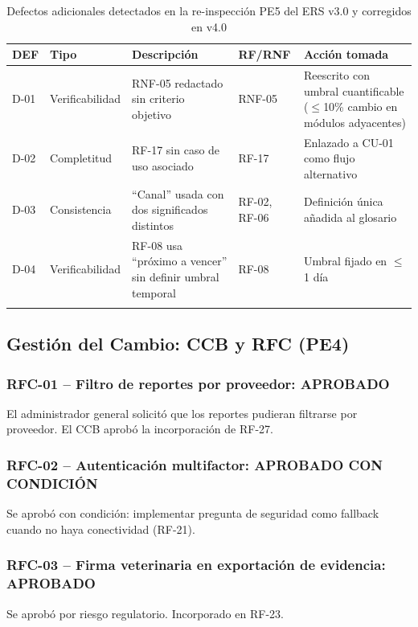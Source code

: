 \documentclass[11pt,a4paper]{article}
\begin{document}
\begin{longtable}{|p{1cm}|p{2.25cm}|p{5cm}|p{2cm}|p{3.5cm}|}
\hline
\textbf{DEF} & \textbf{Tipo} & \textbf{Descripción} & \textbf{RF/RNF} & \textbf{Acción tomada} \\
\hline
D-01 & Verificabilidad & RNF-05 redactado sin criterio objetivo & RNF-05 & Reescrito con umbral cuantificable ($\leq$10\% cambio en módulos adyacentes) \\
\hline
D-02 & Completitud & RF-17 sin caso de uso asociado & RF-17 & Enlazado a CU-01 como flujo alternativo \\
\hline
D-03 & Consistencia & ``Canal'' usada con dos significados distintos & RF-02, RF-06 & Definición única añadida al glosario \\
\hline
D-04 & Verificabilidad & RF-08 usa ``próximo a vencer'' sin definir umbral temporal & RF-08 & Umbral fijado en $\leq$1 día \\
\hline
\caption{Defectos adicionales detectados en la re-inspección PE5 del ERS v3.0 y corregidos en v4.0}
\label{tab:defectos_pe5}
\end{longtable}

\subsection{Gestión del Cambio: CCB y RFC (PE4)}

\subsubsection*{RFC-01 -- Filtro de reportes por proveedor: APROBADO}
El administrador general solicitó que los reportes pudieran filtrarse por proveedor. El CCB aprobó la incorporación de RF-27.

\subsubsection*{RFC-02 -- Autenticación multifactor: APROBADO CON CONDICIÓN}
Se aprobó con condición: implementar pregunta de seguridad como fallback cuando no haya conectividad (RF-21).

\subsubsection*{RFC-03 -- Firma veterinaria en exportación de evidencia: APROBADO}
Se aprobó por riesgo regulatorio. Incorporado en RF-23.

\end{document}
